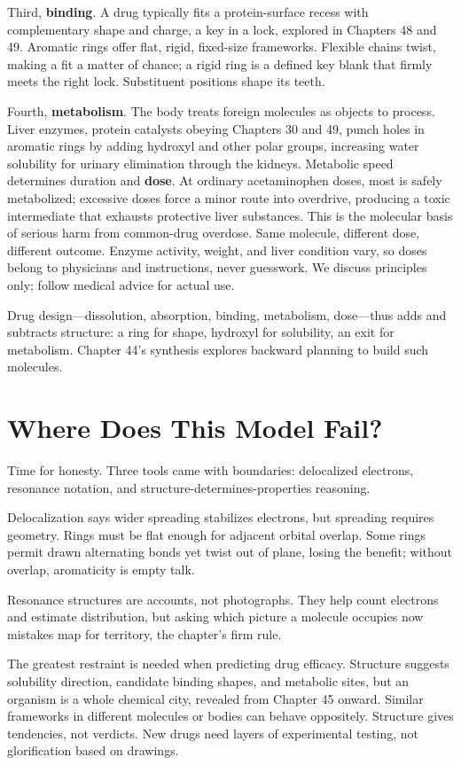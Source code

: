 Third, \textbf{binding}. A drug typically fits a protein-surface recess with complementary shape and charge, a key in a lock, explored in Chapters 48 and 49. Aromatic rings offer flat, rigid, fixed-size frameworks. Flexible chains twist, making a fit a matter of chance; a rigid ring is a defined key blank that firmly meets the right lock. Substituent positions shape its teeth.

Fourth, \textbf{metabolism}. The body treats foreign molecules as objects to process. Liver enzymes, protein catalysts obeying Chapters 30 and 49, punch holes in aromatic rings by adding hydroxyl and other polar groups, increasing water solubility for urinary elimination through the kidneys. Metabolic speed determines duration and \textbf{dose}. At ordinary acetaminophen doses, most is safely metabolized; excessive doses force a minor route into overdrive, producing a toxic intermediate that exhausts protective liver substances. This is the molecular basis of serious harm from common-drug overdose. Same molecule, different dose, different outcome. Enzyme activity, weight, and liver condition vary, so doses belong to physicians and instructions, never guesswork. We discuss principles only; follow medical advice for actual use.

Drug design---dissolution, absorption, binding, metabolism, dose---thus adds and subtracts structure: a ring for shape, hydroxyl for solubility, an exit for metabolism. Chapter 44's synthesis explores backward planning to build such molecules.

\section{Where Does This Model Fail?}

Time for honesty. Three tools came with boundaries: delocalized electrons, resonance notation, and structure-determines-properties reasoning.

Delocalization says wider spreading stabilizes electrons, but spreading requires geometry. Rings must be flat enough for adjacent orbital overlap. Some rings permit drawn alternating bonds yet twist out of plane, losing the benefit; without overlap, aromaticity is empty talk.

Resonance structures are accounts, not photographs. They help count electrons and estimate distribution, but asking which picture a molecule occupies now mistakes map for territory, the chapter's firm rule.

The greatest restraint is needed when predicting drug efficacy. Structure suggests solubility direction, candidate binding shapes, and metabolic sites, but an organism is a whole chemical city, revealed from Chapter 45 onward. Similar frameworks in different molecules or bodies can behave oppositely. Structure gives tendencies, not verdicts. New drugs need layers of experimental testing, not glorification based on drawings.

